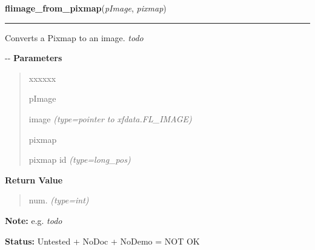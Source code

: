     \vspace{0.5ex}

\hspace{.8\funcindent}\begin{boxedminipage}{\funcwidth}

    \raggedright \textbf{flimage\_from\_pixmap}(\textit{pImage}, \textit{pixmap})

    \vspace{-1.5ex}

    \rule{\textwidth}{0.5\fboxrule}
\setlength{\parskip}{2ex}

Converts a Pixmap to an image. \emph{todo}

-{}-
\setlength{\parskip}{1ex}
      \textbf{Parameters}
      \vspace{-1ex}

      \begin{quote}
        \begin{Ventry}{xxxxxx}

          \item[pImage]


image
            {\it (type=pointer to xfdata.FL\_IMAGE)}

          \item[pixmap]


pixmap id
            {\it (type=long\_pos)}

        \end{Ventry}

      \end{quote}

      \textbf{Return Value}
    \vspace{-1ex}

      \begin{quote}

num.
      {\it (type=int)}

      \end{quote}

\textbf{Note:} 
e.g. \emph{todo}


\textbf{Status:} 
Untested + NoDoc + NoDemo = NOT OK


    \end{boxedminipage}

    \label{xformslib:flflimage:flimage_to_pixmap}

    \vspace{0.5ex}

